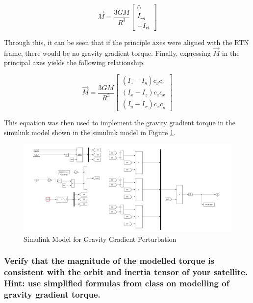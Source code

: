 \begin{equation}
    \Vec{M} = \frac{3GM}{R^3} \begin{bmatrix}
        0 \\
        I_{rn} \\
        - I_{rt}
    \end{bmatrix}
\end{equation}

Through this, it can be seen that if the principle axes were aligned with the RTN frame, there would be no gravity gradient torque. Finally, expressing $\Vec{M}$ in the principal axes yields the following relationship. 

\begin{equation} \label{eq:grav_gradient_torque}
    \Vec{M} = \frac{3GM}{R^3} \begin{bmatrix}
        (I_z - I_y)c_y c_z \\
        (I_x - I_z)c_z c_x \\
        (I_y - I_x)c_x c_y
    \end{bmatrix}
\end{equation}

This equation was then used to implement the gravity gradient torque in the simulink model shown in the simulink model in Figure \ref{fig:grav_gradient_simulink}.

\begin{figure}[H]
    \centering
    \captionsetup{justification = centering}
    \includegraphics[width = 15cm]{Images/PS4/gravity_gradiant_simulink_model.png}
    \caption{Simulink Model for Gravity Gradient Perturbation}
    \label{fig:grav_gradient_simulink}
\end{figure}

\subsubsection{Verify that the magnitude of the modelled torque is consistent with the orbit and inertia tensor of
your satellite. Hint: use simplified formulas from class on modelling of gravity gradient torque.}

